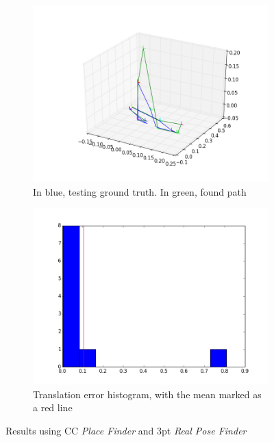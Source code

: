 \begin{figure}[htpb]
  \begin{subfigure}[b]{6cm}
          \includegraphics[width=\linewidth]{img/desktop_2_CC_3pt_path_1.png}
          \caption{In blue, testing ground truth. In green, found path}                
          \label{fig:desktop_2_CC_3pt_path_1}
  \end{subfigure}   
  \qquad
  \begin{subfigure}[b]{6cm}
          \includegraphics[width=\linewidth]{img/desktop_2_CC_3pt_dist_1.png}
          \caption{Translation error histogram, with the mean marked as a red line}                
          \label{fig:desktop_2_CC_3pt_dist_1}
  \end{subfigure}
  \caption{Results using CC \textit{Place Finder} and 3pt  \textit{Real Pose Finder}}
\end{figure}

